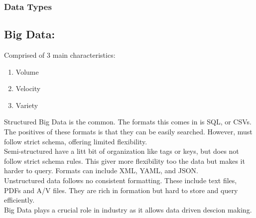 \documentclass[a5paper]{article}
\begin{document}
	\subsubsection{Data Types}
	\subsection{Big Data:}
	Comprised of 3 main characteristics:
	\begin{enumerate}
		\item Volume
		\item Velocity
		\item Variety
	\end{enumerate}
	Structured Big Data is the common. The formats this comes in is SQL, or CSVs. The positives of these formats is that they can be easily searched. However, must follow strict schema, offering limited flexibility.\\
	Semi-structured have a litt bit of organization like tags or keys, but does not follow strict schema rules. This giver more flexibility too the data but makes it harder to query. Formats can include XML, YAML, and JSON.\\
	Unstructured data follows no consistent formatting. These include text files, PDFs and A/V files. They are rich in formation but hard to store and query efficiently.\\
	Big Data plays a crucial role in industry as it allows data driven descion making.
\end{document}
